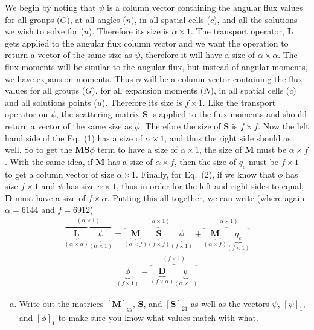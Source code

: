 \documentclass[10pt]{article}
\begin{document}
We begin by noting that $\psi$ is a column vector containing the angular flux values for all groups ($G$), at all angles ($n$), in all spatial cells ($c$), and all the solutions we wish to solve for ($u$). Therefore its size is $\alpha \times 1$. The transport operator, $\textbf{L}$ gets applied to the angular flux column vector and we want the operation to return a vector of the same size as $\psi$, therefore it will have a size of $\alpha \times \alpha$. The flux moments will be similar to the angular flux, but instead of angular moments, we have expansion moments. Thus $\phi$ will be a column vector containing the flux values for all groups ($G$), for all expansion moments ($N$), in all spatial cells ($c$) and all solutions points ($u$). Therefore its size is $f \times 1$. Like the transport operator on $\psi$, the scattering matrix $\textbf{S}$ is applied to the flux moments and should return a vector of the same size as $\phi$. Therefore the size of $\textbf{S}$ is $f \times f$. Now the left hand side of the Eq.~(1) has a size of $\alpha \times 1$, and thus the right side should as well. So to get the $\textbf{MS}\phi$ term to have a size of $\alpha \times 1$, the size of $\textbf{M}$ must be $\alpha \times f$. With the same idea, if $\textbf{M}$ has a size of $\alpha \times f$, then the size of $q_e$ must be $f \times 1$ to get a column vector of size $\alpha \times 1$. Finally, for Eq.~(2), if we know that $\phi$ has size $f \times 1$ and $\psi$ has size $\alpha \times 1$, thus in order for the left and right sides to equal, $\textbf{D}$ must have a size of $ f \times \alpha$. Putting this all together, we can write (where again $\alpha = 6144$ and $f = 6912$)
%
\begin{align*}
	   \overbrace{ \underbrace{\textbf{L}}_{(\alpha \times \alpha)} \underbrace{\psi}_{(\alpha \times 1)} }^{(\alpha \times 1)} = \overbrace{  \underbrace{\textbf{M}}_{(\alpha \times f)}  \underbrace{\textbf{S}}_{(f \times f)} \underbrace{\phi}_{(f \times 1)} }^{(\alpha \times 1)} + \overbrace{ \underbrace{\textbf{M}}_{(\alpha \times f)} \underbrace{q_e}_{(f \times 1)} }^{(\alpha \times 1)}
\end{align*}
\vspace{-10pt}
\begin{align*}
	\underbrace{\phi}_{(f \times 1)} = \overbrace{\underbrace{\textbf{D}}_{(f \times \alpha)} \underbrace{\psi}_{(\alpha \times 1)}}^{(f \times 1)}
\end{align*}

%
%
%

\vspace{10pt}
\begin{enumerate}[(b)]
\item Write out the matrices $[\textbf{M}]_{gg}$, $\textbf{S}$, and $[\textbf{S}]_{21}$ as well as the vectors $\psi$, $[\psi]_1$, and $[\phi]_1$ to make sure you know what values match with what.
\end{enumerate}
\end{document}

